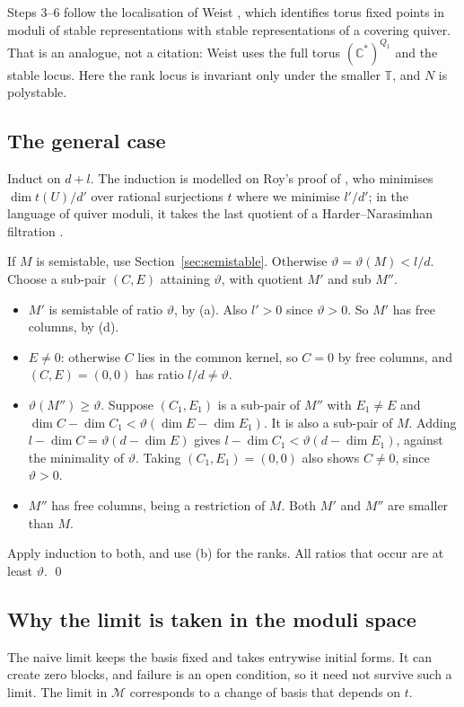 \documentclass[11pt,a4paper]{article}
\theoremstyle{plain}
\theoremstyle{definition}
\newcommand{\C}{\mathbb{C}}
\newcommand{\Tor}{\mathbb{T}}
\newcommand{\Mm}{\mathcal{M}}
\newcommand{\vth}{\vartheta}
\begin{document}
Steps 3--6 follow the localisation of Weist \cite[Th.~3.6, Th.~3.8]{Wei13}, which identifies torus fixed points in moduli of stable representations with stable representations of a covering
quiver. That is an analogue, not a citation: Weist uses the full torus $(\C^{*})^{Q_{1}}$ and the stable locus. Here the rank locus is invariant only under the smaller $\Tor$, and $N$ is polystable.

\subsection{The general case}\label{sec:general}

Induct on $d+l$. The induction is modelled on Roy's proof of \cite[Th.~5, pp.~39--40]{Roy92}, who minimises $\dim t(U)/d'$ over rational surjections $t$ where we minimise $l'/d'$; in the language of quiver moduli, it takes the last quotient of a
Harder--Narasimhan filtration \cite[Prop.~2.5]{Rei03}.

If $M$ is semistable, use Section~\ref{sec:semistable}. Otherwise $\vth=\vth(M)<l/d$. Choose a sub-pair $(C,E)$ attaining $\vth$, with quotient $M'$ and sub $M''$.
\begin{itemize}
\item $M'$ is semistable of ratio $\vth$, by (a). Also $l'>0$ since $\vth>0$. So $M'$ has free columns, by (d).
\item $E\neq0$: otherwise $C$ lies in the common kernel, so $C=0$ by free columns, and $(C,E)=(0,0)$ has ratio $l/d\neq\vth$.
\item $\vth(M'')\ge\vth$. Suppose $(C_{1},E_{1})$ is a sub-pair of $M''$ with $E_{1}\neq E$ and $\dim C-\dim C_{1}<\vth(\dim E-\dim E_{1})$. It is also a sub-pair of $M$. Adding
$l-\dim C=\vth(d-\dim E)$ gives $l-\dim C_{1}<\vth(d-\dim E_{1})$, against the minimality of $\vth$. Taking $(C_{1},E_{1})=(0,0)$ also shows $C\neq0$, since $\vth>0$.
\item $M''$ has free columns, being a restriction of $M$. Both $M'$ and $M''$ are smaller than $M$.
\end{itemize}
Apply induction to both, and use (b) for the ranks. All ratios that occur are at least $\vth$. \qed

\subsection{Why the limit is taken in the moduli space}\label{sec:example}

The naive limit keeps the basis fixed and takes entrywise initial forms. It can create zero blocks, and failure is an open condition, so it need not survive such a limit. The limit in $\Mm$ corresponds to
a change of basis that depends on $t$.
\end{document}
